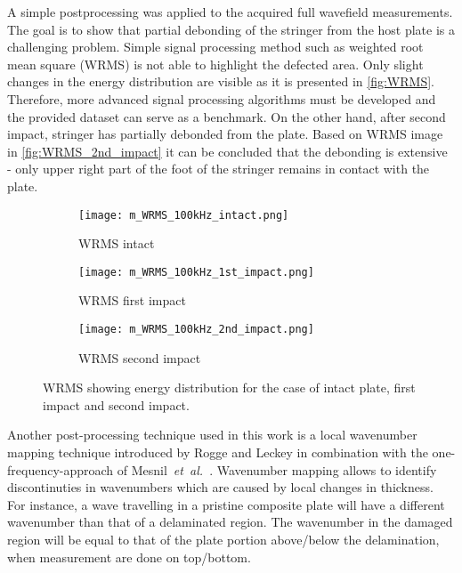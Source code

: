\documentclass[times,final]{elsarticle}
\begin{document}
A simple postprocessing was applied to the acquired full wavefield measurements.
The goal is to show that partial debonding of the stringer from the host plate is a challenging problem.
Simple signal processing method such as weighted root mean square (WRMS)\cite{Radzienski2011} is not able to highlight the defected area. Only slight changes in the energy distribution are visible as it is presented in \autoref{fig:WRMS}.
Therefore, more advanced signal processing algorithms must be developed and the provided dataset can serve as a benchmark.
On the other hand, after second impact, stringer has partially debonded from the plate. Based on WRMS image in \autoref{fig:WRMS_2nd_impact} it can be concluded that the debonding is extensive - only upper right part of the foot of the stringer remains in contact with the plate. 
\begin{figure} [h!]
	\centering
	\begin{subfigure}[b]{0.49\textwidth}
		\texttt{[image: m\_WRMS\_100kHz\_intact.png]}
		\caption{WRMS intact}
		\label{fig:WRMS_intact}
	\end{subfigure}
	\begin{subfigure}[b]{0.49\textwidth}
		\texttt{[image: m\_WRMS\_100kHz\_1st\_impact.png]}
		\caption{WRMS first impact}
		\label{fig:WRMS_1st_impact}
	\end{subfigure}
	\begin{subfigure}[b]{0.49\textwidth}
		\texttt{[image: m\_WRMS\_100kHz\_2nd\_impact.png]}
		\caption{WRMS second impact}
		\label{fig:WRMS_2nd_impact}
	\end{subfigure}
	\caption{WRMS showing energy distribution for the case of intact plate, first impact and second impact.}
	\label{fig:WRMS}
\end{figure}

Another post-processing technique used in this work is a local wavenumber mapping technique introduced by Rogge and Leckey \cite{ROGGE2013} in combination with the one-frequency-approach of Mesnil~\textit{et~al.}~\cite{MESNIL2015}. Wavenumber mapping allows to identify discontinuties in wavenumbers which are caused by local changes in thickness. For instance, a wave travelling in a pristine composite plate will have a different wavenumber than that of a delaminated region. The wavenumber in the damaged region will be equal to that of the plate portion above/below the delamination, when measurement are done on top/bottom. 
\end{document}
